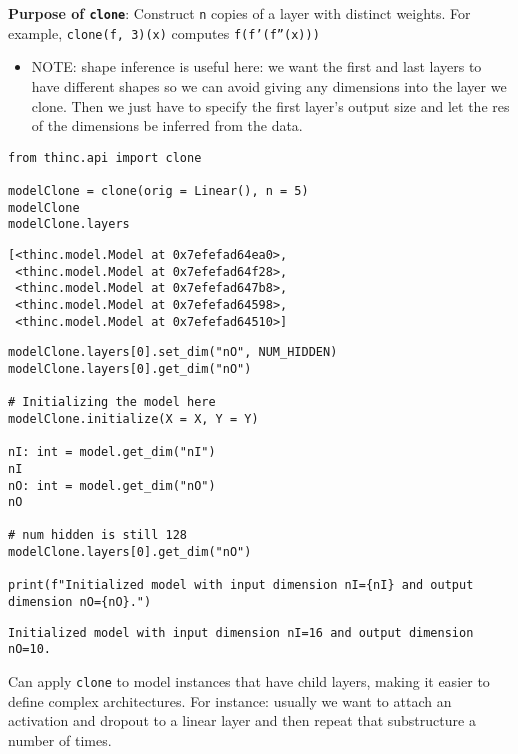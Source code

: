 \documentclass[
]{article}
\providecommand{\tightlist}{%
  \setlength{\itemsep}{0pt}\setlength{\parskip}{0pt}}
\begin{document}
\textbf{Purpose of \texttt{clone}}: Construct
\texttt{n} copies of a layer with distinct weights. For
example, \texttt{clone(f, 3)(x)} computes
\texttt{f(f'(f''(x)))}

\begin{itemize}
\tightlist
\item
  NOTE: shape inference is useful here: we want the first and last
  layers to have different shapes so we can avoid giving any dimensions
  into the layer we clone. Then we just have to specify the first
  layer's output size and let the res of the dimensions be inferred from
  the data.
\end{itemize}

\begin{verbatim}
from thinc.api import clone

modelClone = clone(orig = Linear(), n = 5)
modelClone
modelClone.layers
\end{verbatim}

\begin{verbatim}
[<thinc.model.Model at 0x7efefad64ea0>,
 <thinc.model.Model at 0x7efefad64f28>,
 <thinc.model.Model at 0x7efefad647b8>,
 <thinc.model.Model at 0x7efefad64598>,
 <thinc.model.Model at 0x7efefad64510>]
\end{verbatim}

\begin{verbatim}
modelClone.layers[0].set_dim("nO", NUM_HIDDEN)
modelClone.layers[0].get_dim("nO")

# Initializing the model here
modelClone.initialize(X = X, Y = Y)

nI: int = model.get_dim("nI")
nI
nO: int = model.get_dim("nO")
nO

# num hidden is still 128
modelClone.layers[0].get_dim("nO")

print(f"Initialized model with input dimension nI={nI} and output dimension nO={nO}.")
\end{verbatim}

\begin{verbatim}
Initialized model with input dimension nI=16 and output dimension nO=10.
\end{verbatim}

Can apply \texttt{clone} to model instances that have
child layers, making it easier to define complex architectures. For
instance: usually we want to attach an activation and dropout to a
linear layer and then repeat that substructure a number of times.
\end{document}
